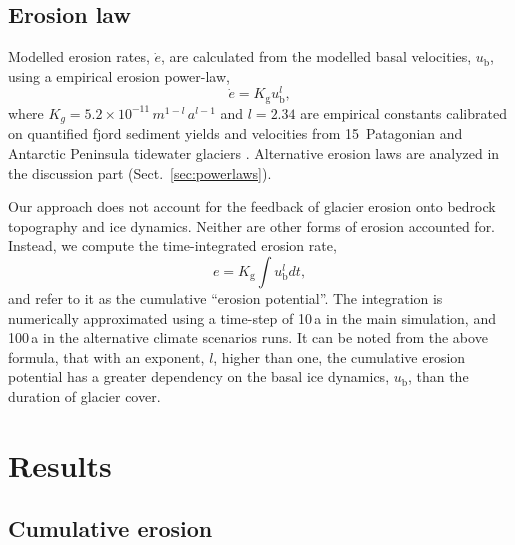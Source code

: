 \documentclass[utf8]{article}
\begin{document}
\subsection{Erosion law}

    Modelled erosion rates, $\dot{e}$, are calculated from the modelled basal
    velocities, $u_\mathrm{b}$, using a empirical erosion power-law,
    \begin{equation}
        \dot{e} = K_\mathrm{g} u_\mathrm{b}^l ,
    \end{equation}
    where $K_g = 5.2\times 10^{-11}\,m^{1-l}\,a^{l-1}$ and $l = 2.34$ are
    empirical constants calibrated on quantified fjord sediment yields and
    velocities from 15~Patagonian and Antarctic Peninsula tidewater glaciers
    \citep{Koppes.etal.2015}. Alternative erosion laws are analyzed in the
    discussion part (Sect.~\ref{sec:powerlaws}).

    Our approach does not account for the feedback of glacier erosion onto
    bedrock topography and ice dynamics. Neither are other forms of erosion
    accounted for. Instead, we compute the time-integrated erosion rate,
    \begin{equation}
        e =  K_\mathrm{g} \int u_\mathrm{b}^l dt,
    \end{equation}
    and refer to it as the cumulative ``erosion potential''. The integration
    is numerically approximated using a time-step of 10\,a in the
    main simulation, and 100\,a in the alternative climate scenarios runs. It
    can be noted from the above formula, that with an exponent, $l$,
    higher than one, the cumulative erosion potential has a greater dependency
    on the basal ice dynamics, $u_\mathrm{b}$, than the duration of glacier
    cover.


\section{Results}

\subsection{Cumulative erosion}
\end{document}
